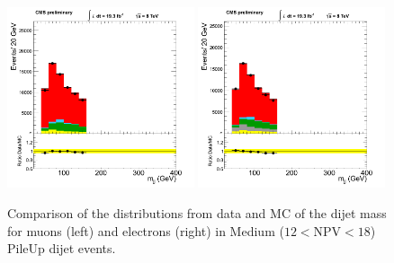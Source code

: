 \begin{figure}[h!t]
  {\centering
    \includegraphics[width=0.49\textwidth]{figs/puchecks/mu_MedNPV_mjj.png}
    \includegraphics[width=0.49\textwidth]{figs/puchecks/el_MedNPV_mjj.png}
    \caption{Comparison of the distributions from data and MC of the
    dijet mass for muons (left) and electrons (right)
    in Medium ($12<$NPV$<18$) PileUp dijet events.}
\label{fig:pu_mjjMed}}
\end{figure}
